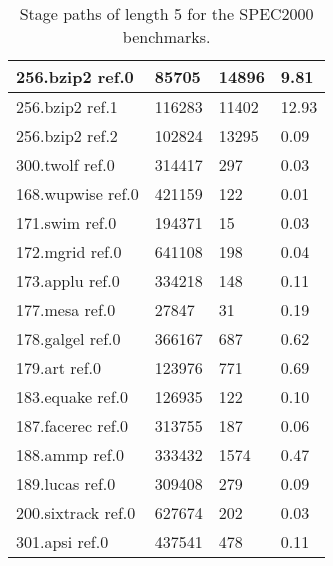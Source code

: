 \begin{table}[t!]
\begin{tabular}{|p{1.3in}|p{1.0in}|p{1.0in}|p{1.0in}|}
\hline
256.bzip2 ref.0&85705&14896&9.81\\
\hline
256.bzip2 ref.1&116283&11402&12.93\\
\hline
256.bzip2 ref.2&102824&13295&0.09\\
\hline
300.twolf ref.0&314417&297&0.03\\
\hline\hline
168.wupwise ref.0&421159&122&0.01\\
\hline
171.swim ref.0&194371&15&0.03\\
\hline
172.mgrid ref.0&641108&198&0.04\\
\hline
173.applu ref.0&334218&148&0.11\\
\hline
177.mesa ref.0&27847&31&0.19\\
\hline
178.galgel ref.0&366167&687&0.62\\
\hline
179.art ref.0&123976&771&0.69\\
\hline
183.equake ref.0&126935&122&0.10\\
\hline
187.facerec ref.0&313755&187&0.06\\
\hline
188.ammp ref.0&333432&1574&0.47\\
\hline
189.lucas ref.0&309408&279&0.09\\
\hline
200.sixtrack ref.0&627674&202&0.03\\
\hline
301.apsi ref.0&437541&478&0.11\\
\hline
\end{tabular}
\caption{Stage paths of length 5 for the SPEC2000 benchmarks.}
\label{table:stage_path_5}
\end{table}

